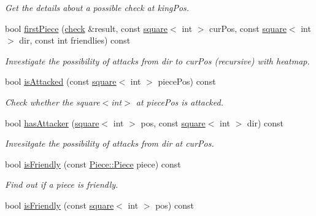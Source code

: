 \begin{DoxyCompactItemize}
\begin{DoxyCompactList}\small\item\em Get the details about a possible check at king\+Pos. \end{DoxyCompactList}\item 
bool \hyperlink{classBoard_a36298e9258372ab79f6b9fe7c6d68725}{first\+Piece} (\hyperlink{structcheck}{check} \&result, const \hyperlink{structsquare}{square}$<$ int $>$ cur\+Pos, const \hyperlink{structsquare}{square}$<$ int $>$ dir, const int friendlies) const 
\begin{DoxyCompactList}\small\item\em Investigate the possibility of attacks from dir to cur\+Pos (recursive) with heatmap. \end{DoxyCompactList}\item 
bool \hyperlink{classBoard_a63f65a6eb6397e49411afac21fbde0f9}{is\+Attacked} (const \hyperlink{structsquare}{square}$<$ int $>$ piece\+Pos) const \hypertarget{classBoard_a63f65a6eb6397e49411afac21fbde0f9}{}\label{classBoard_a63f65a6eb6397e49411afac21fbde0f9}

\begin{DoxyCompactList}\small\item\em Check whether the square$<$int$>$ at piece\+Pos is attacked. \end{DoxyCompactList}\item 
bool \hyperlink{classBoard_ab3a977ba17a7e6d6b669777566165b35}{has\+Attacker} (\hyperlink{structsquare}{square}$<$ int $>$ pos, const \hyperlink{structsquare}{square}$<$ int $>$ dir) const 
\begin{DoxyCompactList}\small\item\em Invesitgate the possibility of attacks from dir at cur\+Pos. \end{DoxyCompactList}\item 
bool \hyperlink{classBoard_a4f66a7e8970e2aa204785de11655c00e}{is\+Friendly} (const \hyperlink{namespacePiece_a588233307aa6bdb32c1d62c9f20895cc}{Piece\+::\+Piece} piece) const \hypertarget{classBoard_a4f66a7e8970e2aa204785de11655c00e}{}\label{classBoard_a4f66a7e8970e2aa204785de11655c00e}

\begin{DoxyCompactList}\small\item\em Find out if a piece is friendly. \end{DoxyCompactList}\item 
bool \hyperlink{classBoard_a0a0c7f2b780d03bea4db3e3092f6ee01}{is\+Friendly} (const \hyperlink{structsquare}{square}$<$ int $>$ pos) const \hypertarget{classBoard_a0a0c7f2b780d03bea4db3e3092f6ee01}{}\label{classBoard_a0a0c7f2b780d03bea4db3e3092f6ee01}


\end{DoxyCompactItemize}
